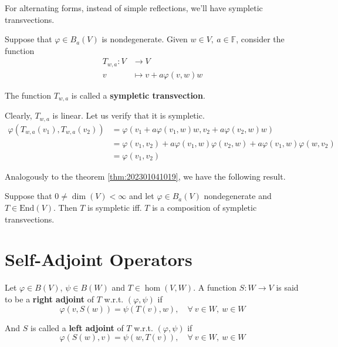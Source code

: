 For alternating forms, instead of simple reflections, we'll have sympletic transvections. 

\begin{definition}
  Suppose that $\varphi \in B_a(V)$ is nondegenerate. Given $w \in V, ~a \in \mathbb{F}$, consider the function 
  \begin{equation*}
    \begin{aligned}
      T_{w,a} : V &\longrightarrow V \\
      v &\longmapsto v + a \varphi(v,w) w
    \end{aligned}
  \end{equation*}
  
  The function $T_{w,a}$ is called a \textbf{sympletic transvection}.
\end{definition}

Clearly, $T_{w,a}$ is linear. Let us verify that it is sympletic. 
\begin{equation*}
  \begin{aligned}
    \varphi(T_{w,a}(v_1), T_{w,a}(v_2)) &= \varphi(v_1 + a \varphi(v_1, w) w, v_2 + a \varphi(v_2, w) w) \\
    &= \varphi(v_1, v_2) + a \varphi(v_1, w) \varphi(v_2, w) + a \varphi(v_1, w) \varphi(w, v_2) \\
    &= \varphi(v_1, v_2)
  \end{aligned}
\end{equation*}

Analogously to the theorem \ref{thm:202301041019}, we have the following result.

\begin{theorem}
  Suppose that $0 \neq \dim(V) < \infty$ and let $\varphi \in B_a(V)$ nondegenerate and $T \in \text{End}(V)$. Then $T$ is sympletic iff. $T$ is a composition of sympletic transvections.
\end{theorem}

\section{Self-Adjoint Operators}

\begin{definition}[Adjoint]
  Let $\varphi \in B(V)$, $\psi \in B(W)$ and $T \in \hom(V,W)$. A function $S : W \longrightarrow V$ is said to be a \textbf{right adjoint} of $T$ w.r.t. $(\varphi, \psi)$ if 
  \[
    \varphi(v, S(w)) = \psi(T(v), w), \quad \forall~ v\in W, ~w \in W
  \]

  And $S$ is called a \textbf{left adjoint} of $T$ w.r.t. $(\varphi, \psi)$ if 
  \[
    \varphi(S(w), v) = \psi(w, T(v)), \quad \forall~ v\in W, ~w \in W
  \]
\end{definition}

